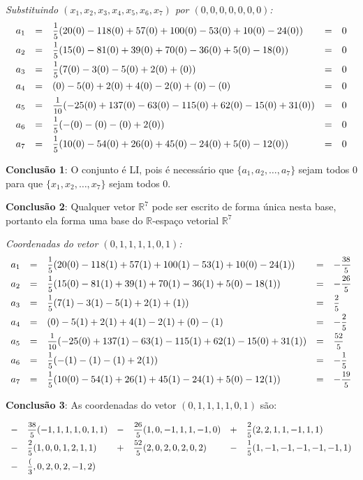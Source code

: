 \documentclass[11pt]{article}
\newenvironment{question}[1]
  {\par\addvspace{\medskipamount}
   \noindent\makebox[0pt][r]{\textbf{#1)} }\ignorespaces}
  {\par\addvspace{\medskipamount}}
\begin{document}
\begin{question}{4}
\newpage
\textit{Substituindo $(x_1,x_2,x_3,x_4,x_5,x_6,x_7)$ por $(0,0,0,0,0,0,0)$:}
$$
\begin{array}{rclcl}
    a_1 &= &\mfrac{1}{5}(20(0)-118(0)+57(0)+100(0)-53(0)+10(0)-24(0)) &= &0\\[.5em]
    a_2 &= &\mfrac{1}{5}(15(0)-81(0)+39(0)+70(0)-36(0)+5(0)-18(0)) &= &0\\[.5em]
    a_3 &= &\mfrac{1}{5}(7(0)-3(0)-5(0)+2(0)+(0)) &= &0\\[.5em]
    a_4 &= &(0)-5(0)+2(0)+4(0)-2(0)+(0)-(0) &= &0\\[.5em]
    a_5 &= &\mfrac{1}{10}(-25(0)+137(0)-63(0)-115(0)+62(0)-15(0)+31(0)) &= &0\\[.5em]
    a_6 &= &\mfrac{1}{5}(-(0)-(0)-(0)+2(0)) &= &0\\[.5em]
    a_7 &= &\mfrac{1}{5}(10(0)-54(0)+26(0)+45(0)-24(0)+5(0)-12(0)) &= &0
\end{array}
$$

\textbf{Conclusão 1}: O conjunto é LI, pois é necessário que $\{a_1,a_2, \ldots ,a_7\}$ sejam todos 0 para que $\{x_1,x_2, \ldots ,x_7\}$ sejam todos 0.

\textbf{Conclusão 2}: Qualquer vetor $\mathbb{R}^7$ pode ser escrito de forma única nesta base, portanto ela forma uma base do $\mathbb{R}$-espaço vetorial $\mathbb{R}^7$

\bigskip
\textit{Coordenadas do vetor $(0,1,1,1,1,0,1)$:}
$$
\begin{array}{rclcl}
    a_1 &= &\mfrac{1}{5}(20(0)-118(1)+57(1)+100(1)-53(1)+10(0)-24(1)) &= &-\mfrac{38}{5}\\[.5em]
    a_2 &= &\mfrac{1}{5}(15(0)-81(1)+39(1)+70(1)-36(1)+5(0)-18(1)) &= &-\mfrac{26}{5}\\[.5em]
    a_3 &= &\mfrac{1}{5}(7(1)-3(1)-5(1)+2(1)+(1)) &= &\mfrac{2}{5}\\[.5em]
    a_4 &= &(0)-5(1)+2(1)+4(1)-2(1)+(0)-(1) &= &-\mfrac{2}{5}\\[.5em]
    a_5 &= &\mfrac{1}{10}(-25(0)+137(1)-63(1)-115(1)+62(1)-15(0)+31(1)) &= &\mfrac{52}{5}\\[.5em]
    a_6 &= &\mfrac{1}{5}(-(1)-(1)-(1)+2(1)) &= &-\mfrac{1}{5}\\[.5em]
    a_7 &= &\mfrac{1}{5}(10(0)-54(1)+26(1)+45(1)-24(1)+5(0)-12(1)) &= &-\mfrac{19}{5}
\end{array}
$$

\textbf{Conclusão 3}: As coordenadas do vetor $(0,1,1,1,1,0,1)$ são:

$$
\begin{array}{clclcl}
- &\mfrac{38}{5}(-1,1,1,1,0,1,1) &- &\mfrac{26}{5}(1,0,-1,1,1,-1,0) &+ &\mfrac{2}{5}(2,2,1,1,-1,1,1)\\[.5em]
- &\mfrac{2}{5}(1,0,0,1,2,1,1) &+ &\mfrac{52}{5}(2,0,2,0,2,0,2)  &- &\mfrac{1}{5}(1,-1,-1,-1,-1,-1,1)\\[.5em]
- &\mfrac(3,0,2,0,2,-1,2) & & & &
\end{array}
$$

\end{question}
\end{document}
